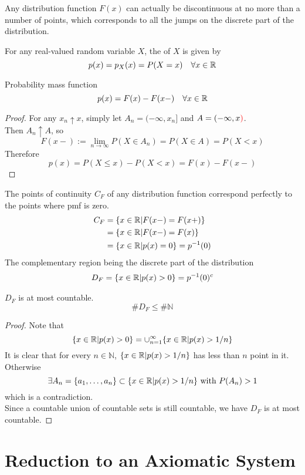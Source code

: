 \documentclass[11pt]{article}
\numberwithin{equation}{section}
\begin{document}
\remark
Any distribution function $F(x)$ can actually be discontinuous at no more than a  number of points, which corresponds to all the jumps on the discrete part of the distribution.

 For any real-valued random variable $X$, the  of $X$ is given by
$$p(x) = p_X(x) = P(X=x) \quad \forall x \in \mathbb{R}$$

\proposition Probability mass function
\begin{equation}
	p(x) = F(x) - F(x-) \quad \forall x \in \mathbb{R}
\end{equation}
\begin{proof}
For any $x_n \uparrow x$, simply let $A_n = (-\infty, x_n]$ and $A=(-\infty, x\textcolor{red}{)}$. \\
Then $A_n \uparrow A$, so 
$$F(x-) := \lim_{n \rightarrow \infty} P(X \in A_n) = P(X \in A) = P(X < x)$$
Therefore
$$p(x) = P(X \leq x) - P(X < x) = F(x) - F(x-)$$ 
\end{proof}

\remark
The points of continuity $C_F$ of any distribution function correspond perfectly to the points where pmf is zero.
\begin{align*}
	C_F &= \{ x \in \mathbb{R} | F(x-) = F(x+) \} \\
	&= \{ x \in \mathbb{R} | F(x-) = F(x) \} \\
	&= \{ x \in \mathbb{R} | p(x) = 0\} = p^{-1}(0)
\end{align*}
The complementary region being the discrete part of the distribution
\begin{align*}
	D_F = \{x \in \mathbb{R} | p(x) > 0\} = p^{-1}(0)^c
\end{align*}

\proposition $D_F$ is at most countable.
$$\# D_F \leq \# \mathbb{N}$$
\begin{proof}
	Note that
	$$\{ x \in \mathbb{R} | p(x) > 0 \} = \cup_{n=1}^\infty \{ x \in \mathbb{R} | p(x) > 1/n\}$$
	It is clear that for every $n \in \mathbb{N}$, $\{ x \in \mathbb{R} | p(x) > 1/n\}$ has less than $n$ point in it. Otherwise
	$$\exists A_n = \{a_1, \hdots, a_n\} \subset \{x \in \mathbb{R} | p(x) > 1/n \} \text{ with } P(A_n) > 1$$
	which is a contradiction.\\
	Since a countable union of countable sets is still countable, we have $D_F$ is at most countable.
\end{proof}


\section{Reduction to an Axiomatic System}
\end{document}
